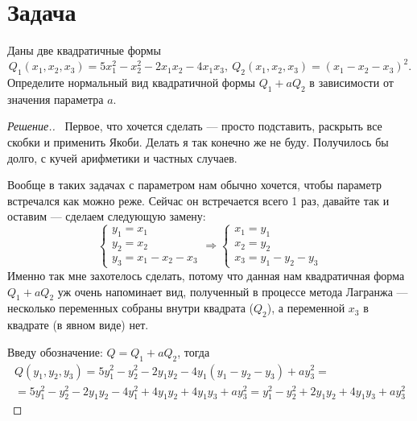 \documentclass[a4paper]{article}
\theoremstyle{remark}
\newcommand{\eq}[1]{\begin{cases} #1 \end{cases}}
\begin{document}
    \section*{Задача }
        Даны две квадратичные формы 
        \[ 
            Q_1(x_1, x_2, x_3) = 5x_1^2 - x_2^2 - 2x_1x_2 - 4x_1x_3, \
            Q_2(x_1, x_2, x_3) = (x_1 - x_2 - x_3)^2. 
        \]
         Определите нормальный вид квадратичной формы $Q_1 + aQ_2$ в зависимости 
         от значения параметра $a$.
        \begin{proof}[Решение.] \ 
            Первое, что хочется сделать --- просто подставить, 
            раскрыть все скобки и применить Якоби. Делать я так конечно же не буду. Получилось бы долго, 
            с кучей арифметики и частных случаев. 

            Вообще в таких задачах с параметром нам обычно хочется, чтобы параметр 
            встречался как можно реже. Сейчас он встречается всего 1 раз, давайте так и оставим --- сделаем 
            следующую замену: 
            \[
                \eq{
                    y_1 = x_1\\ 
                    y_2 = x_2 \\ 
                    y_3 = x_1 - x_2 - x_3
                } 
                \Rightarrow
                \eq{
                    x_1 = y_1\\ 
                    x_2 = y_2 \\ 
                    x_3 = y_1 - y_2 - y_3
                }
            \]
            Именно так мне захотелось сделать, потому что данная нам квадратичная форма $Q_1 + aQ_2$ 
            уж очень напоминает вид, полученный в процессе метода Лагранжа --- 
            несколько переменных собраны внутри квадрата ($Q_2$), а переменной $x_3$ в квадрате (в явном виде) нет.
            
            Введу обозначение: $Q = Q_1 + aQ_2$, тогда 
            \begin{multline*}
                Q(y_1, y_2, y_3) = 
                5y_1^2 - y_2^2 - 2y_1y_2 - 4y_1(y_1 - y_2 - y_3) + ay_3^2 = \\ =
                5y_1^2 - y_2^2 - 2y_1y_2 - 4y_1^2 + 4y_1y_2 + 4y_1y_3 + ay_3^2 = 
                y_1^2 - y_2^2 + 2y_1y_2 + 4y_1y_3 + ay_3^2
            \end{multline*}


\end{proof}
\end{document}
